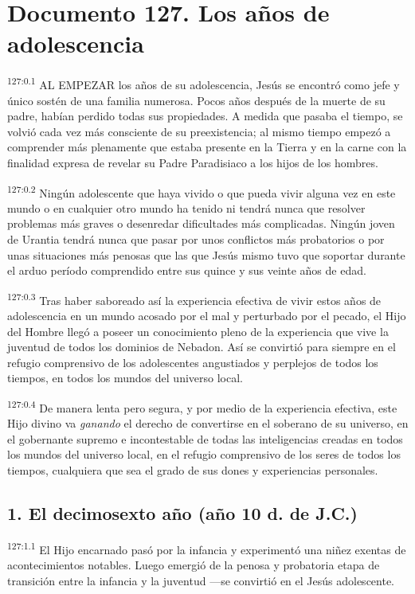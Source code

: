 \chapter{Documento 127. Los años de adolescencia}
\par
\textsuperscript{127:0.1} AL EMPEZAR los años de su adolescencia, Jesús se encontró como jefe y único sostén de una familia numerosa. Pocos años después de la muerte de su padre, habían perdido todas sus propiedades. A medida que pasaba el tiempo, se volvió cada vez más consciente de su preexistencia; al mismo tiempo empezó a comprender más plenamente que estaba presente en la Tierra y en la carne con la finalidad expresa de revelar su Padre Paradisiaco a los hijos de los hombres.

\par
\textsuperscript{127:0.2} Ningún adolescente que haya vivido o que pueda vivir alguna vez en este mundo o en cualquier otro mundo ha tenido ni tendrá nunca que resolver problemas más graves o desenredar dificultades más complicadas. Ningún joven de Urantia tendrá nunca que pasar por unos conflictos más probatorios o por unas situaciones más penosas que las que Jesús mismo tuvo que soportar durante el arduo período comprendido entre sus quince y sus veinte años de edad.

\par
\textsuperscript{127:0.3} Tras haber saboreado así la experiencia efectiva de vivir estos años de adolescencia en un mundo acosado por el mal y perturbado por el pecado, el Hijo del Hombre llegó a poseer un conocimiento pleno de la experiencia que vive la juventud de todos los dominios de Nebadon. Así se convirtió para siempre en el refugio comprensivo de los adolescentes angustiados y perplejos de todos los tiempos, en todos los mundos del universo local.

\par
\textsuperscript{127:0.4} De manera lenta pero segura, y por medio de la experiencia efectiva, este Hijo divino va \textit{ganando} el derecho de convertirse en el soberano de su universo, en el gobernante supremo e incontestable de todas las inteligencias creadas en todos los mundos del universo local, en el refugio comprensivo de los seres de todos los tiempos, cualquiera que sea el grado de sus dones y experiencias personales.

\section*{1. El decimosexto año (año 10 d. de J.C.)}
\par
\textsuperscript{127:1.1} El Hijo encarnado pasó por la infancia y experimentó una niñez exentas de acontecimientos notables. Luego emergió de la penosa y probatoria etapa de transición entre la infancia y la juventud ---se convirtió en el Jesús adolescente.

